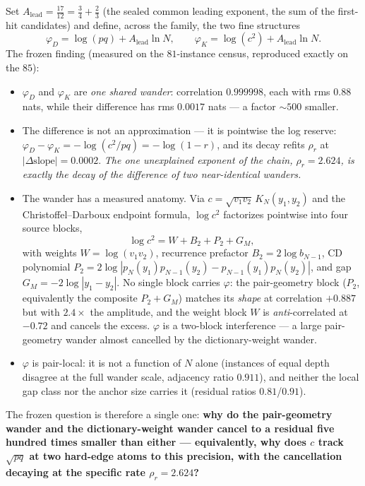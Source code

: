 \documentclass[11pt]{article}
\theoremstyle{remark}
\begin{document}
Set $A_{\mathrm{lead}}=\tfrac{17}{12}=\tfrac34+\tfrac23$ (the sealed
common leading exponent, the sum of the first-hit candidates) and
define, across the family, the two fine structures
\[
\varphi_{D}=\log(pq)+A_{\mathrm{lead}}\ln N,
\qquad
\varphi_{K}=\log(c^{2})+A_{\mathrm{lead}}\ln N .
\]
The frozen finding (measured on the $81$-instance census, reproduced
exactly on the $85$):
\begin{itemize}
\item $\varphi_{D}$ and $\varphi_{K}$ are \emph{one shared wander}:
correlation $0.999998$, each with rms $0.88$ nats, while their
difference has rms $0.0017$ nats --- a factor $\sim500$ smaller.
\item The difference is not an approximation --- it is pointwise the
log reserve: $\varphi_{D}-\varphi_{K}=-\log(c^{2}/pq)=-\log(1-r)$,
and its decay refits $\rho_{r}$ at $|{\Delta}\text{slope}|=0.0002$.
\emph{The one unexplained exponent of the chain, $\rho_{r}=2.624$,
is exactly the decay of the difference of two near-identical
wanders.}
\item The wander has a measured anatomy.  Via
$c=\sqrt{v_{1}v_{2}}\,K_{N}(y_{1},y_{2})$ and the
Christoffel--Darboux endpoint formula, $\log c^{2}$ factorizes
pointwise into four source blocks,
\[
\log c^{2}=W+B_{2}+P_{2}+G_{M},
\]
with weights $W=\log(v_{1}v_{2})$, recurrence prefactor
$B_{2}=2\log b_{N-1}$, CD polynomial
$P_{2}=2\log|p_{N}(y_{1})p_{N-1}(y_{2})-p_{N-1}(y_{1})p_{N}(y_{2})|$,
and gap $G_{M}=-2\log|y_{1}-y_{2}|$.  No single block carries
$\varphi$: the pair-geometry block ($P_{2}$, equivalently the
composite $P_{2}+G_{M}$) matches its \emph{shape} at correlation
$+0.887$ but with $2.4\times$ the amplitude, and the weight block
$W$ is \emph{anti}-correlated at $-0.72$ and cancels the excess.
$\varphi$ is a two-block interference --- a large pair-geometry
wander almost cancelled by the dictionary-weight wander.
\item $\varphi$ is pair-local: it is not a function of $N$ alone
(instances of equal depth disagree at the full wander scale,
adjacency ratio $0.911$), and neither the local gap class nor the
anchor size carries it (residual ratios $0.81$/$0.91$).
\end{itemize}
The frozen question is therefore a single one: \textbf{why do the
pair-geometry wander and the dictionary-weight wander cancel to a
residual five hundred times smaller than either --- equivalently,
why does $c$ track $\sqrt{pq}$ at two hard-edge atoms to this
precision, with the cancellation decaying at the specific rate
$\rho_{r}=2.624$?}
\end{document}
